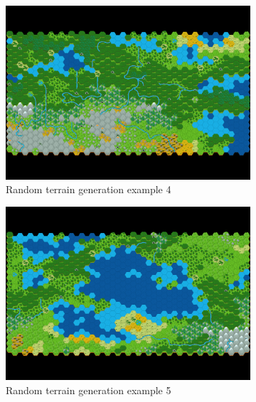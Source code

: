 \documentclass[english]{tudscrreprt}
\begin{document}
\begin{figure}[h]
\begin{subfigure}[b]{0.32\textwidth}
    \includegraphics[width=\textwidth]{figures/hexGrid4.png}
    \caption{Random terrain generation example 4}
    \label{fig:terrain_4}
\end{subfigure}
\hfill
\begin{subfigure}[b]{0.32\textwidth}
    \includegraphics[width=\textwidth]{figures/hexGrid5.png}
    \caption{Random terrain generation example 5}
    \label{fig:terrain_5}
\end{subfigure}
\hfill
\begin{subfigure}[b]{0.32\textwidth}

\end{subfigure}
\end{figure}
\end{document}
